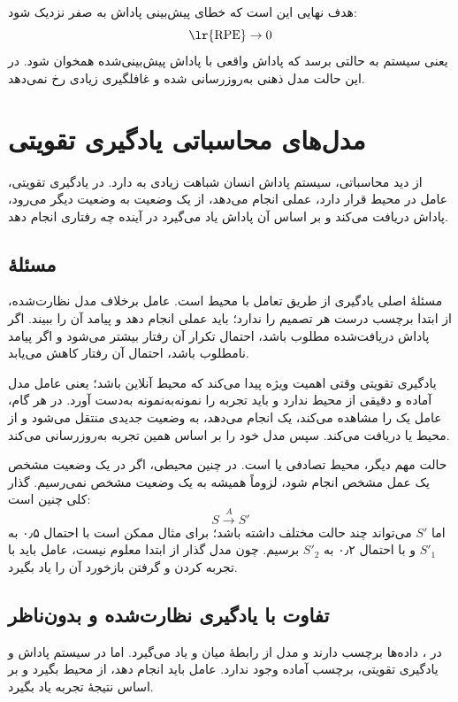 هدف نهایی این است که خطای پیش‌بینی پاداش به صفر نزدیک شود:
\[
\text{\lr{RPE}} \rightarrow 0
\]
یعنی سیستم به حالتی برسد که پاداش واقعی با پاداش پیش‌بینی‌شده همخوان شود. در این حالت مدل ذهنی به‌روزرسانی شده و غافلگیری زیادی رخ نمی‌دهد.

\section{مدل‌های محاسباتی یادگیری تقویتی}
از دید محاسباتی، سیستم پاداش انسان شباهت زیادی به  دارد. در یادگیری تقویتی، عامل در محیط قرار دارد، عملی انجام می‌دهد، از یک وضعیت به وضعیت دیگر می‌رود، پاداش دریافت می‌کند و بر اساس آن پاداش یاد می‌گیرد در آینده چه رفتاری انجام دهد.

\subsection{مسئلهٔ }
مسئلهٔ اصلی  یادگیری از طریق تعامل با محیط است. عامل برخلاف مدل نظارت‌شده، از ابتدا برچسب درست هر تصمیم را ندارد؛ باید عملی انجام دهد و پیامد آن را ببیند. اگر پاداش دریافت‌شده مطلوب باشد، احتمال تکرار آن رفتار بیشتر می‌شود و اگر پیامد نامطلوب باشد، احتمال آن رفتار کاهش می‌یابد.

یادگیری تقویتی وقتی اهمیت ویژه پیدا می‌کند که محیط آنلاین باشد؛ یعنی عامل مدل آماده و دقیقی از محیط ندارد و باید تجربه را نمونه‌به‌نمونه به‌دست آورد. در هر گام، عامل یک  را مشاهده می‌کند، یک  انجام می‌دهد، به وضعیت جدیدی منتقل می‌شود و از محیط  یا  دریافت می‌کند. سپس مدل خود را بر اساس همین تجربه به‌روزرسانی می‌کند.

حالت مهم دیگر، محیط تصادفی یا  است. در چنین محیطی، اگر در یک وضعیت مشخص یک عمل مشخص انجام شود، لزوماً همیشه به یک وضعیت مشخص نمی‌رسیم. گذار کلی چنین است:
\[
S \xrightarrow{A} S'
\]
اما \(S'\) می‌تواند چند حالت مختلف داشته باشد؛ برای مثال ممکن است با احتمال ۰٫۵ به \(S'_1\) و با احتمال ۰٫۲ به \(S'_2\) برسیم. چون مدل گذار از ابتدا معلوم نیست، عامل باید با تجربه کردن و گرفتن بازخورد آن را یاد بگیرد.

\subsection{تفاوت با یادگیری نظارت‌شده و بدون‌ناظر}
در ، داده‌ها برچسب دارند و مدل از رابطهٔ میان  و  یاد می‌گیرد. اما در سیستم پاداش و یادگیری تقویتی، برچسب آماده وجود ندارد. عامل باید  انجام دهد، از محیط  بگیرد و بر اساس نتیجهٔ تجربه یاد بگیرد.

